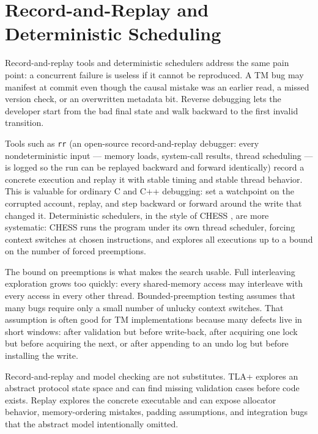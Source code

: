 \section{Record-and-Replay and Deterministic Scheduling}

Record-and-replay tools and deterministic schedulers address the same pain point: a concurrent failure is useless if it cannot be reproduced. A TM bug may manifest at commit even though the causal mistake was an earlier read, a missed version check, or an overwritten metadata bit. Reverse debugging lets the developer start from the bad final state and walk backward to the first invalid transition.

Tools such as \texttt{rr} (an open-source record-and-replay debugger: every nondeterministic input --- memory loads, system-call results, thread scheduling --- is logged so the run can be replayed backward and forward identically) record a concrete execution and replay it with stable timing and stable thread behavior. This is valuable for ordinary C and C++ debugging: set a watchpoint on the corrupted account, replay, and step backward or forward around the write that changed it. Deterministic schedulers, in the style of CHESS \cite{musuvathi08chess}, are more systematic: CHESS runs the program under its own thread scheduler, forcing context switches at chosen instructions, and explores all executions up to a bound on the number of forced preemptions.

The bound on preemptions is what makes the search usable. Full interleaving exploration grows too quickly: every shared-memory access may interleave with every access in every other thread. Bounded-preemption testing assumes that many bugs require only a small number of unlucky context switches. That assumption is often good for TM implementations because many defects live in short windows: after validation but before write-back, after acquiring one lock but before acquiring the next, or after appending to an undo log but before installing the write.

Record-and-replay and model checking are not substitutes. TLA+ explores an abstract protocol state space and can find missing validation cases before code exists. Replay explores the concrete executable and can expose allocator behavior, memory-ordering mistakes, padding assumptions, and integration bugs that the abstract model intentionally omitted.

